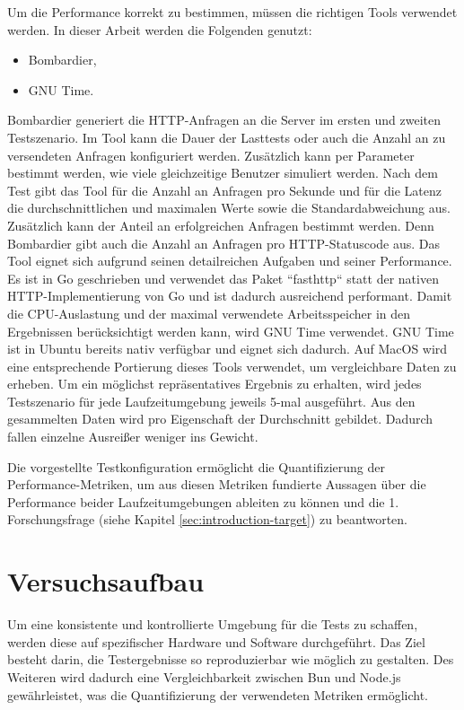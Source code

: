 \noindent
Um die Performance korrekt zu bestimmen, müssen die richtigen Tools verwendet werden. In dieser Arbeit werden die Folgenden genutzt:

\begin{itemize}
	\item Bombardier,
	\item GNU Time.
\end{itemize}

\noindent
Bombardier generiert die HTTP-Anfragen an die Server im ersten und zweiten Testszenario. Im Tool kann die Dauer der Lasttests oder auch die Anzahl an zu versendeten Anfragen konfiguriert werden. Zusätzlich kann per Parameter bestimmt werden, wie viele gleichzeitige Benutzer simuliert werden. Nach dem Test gibt das Tool für die Anzahl an Anfragen pro Sekunde und für die Latenz die durchschnittlichen und maximalen Werte sowie die Standardabweichung aus. Zusätzlich kann der Anteil an erfolgreichen Anfragen bestimmt werden. Denn Bombardier gibt auch die Anzahl an Anfragen pro HTTP-Statuscode aus. Das Tool eignet sich aufgrund seinen detailreichen Aufgaben und seiner Performance. Es ist in Go geschrieben und verwendet das Paket ``fasthttp`` statt der nativen HTTP-Implementierung von Go und ist dadurch ausreichend performant. Damit die CPU-Auslastung und der maximal verwendete Arbeitsspeicher in den Ergebnissen berücksichtigt werden kann, wird GNU Time verwendet. GNU Time ist in Ubuntu bereits nativ verfügbar und eignet sich dadurch. Auf MacOS wird eine entsprechende Portierung dieses Tools verwendet, um vergleichbare Daten zu erheben. \newline
Um ein möglichst repräsentatives Ergebnis zu erhalten, wird jedes Testszenario für jede Laufzeitumgebung jeweils 5-mal ausgeführt. Aus den gesammelten Daten wird pro Eigenschaft der Durchschnitt gebildet. Dadurch fallen einzelne Ausreißer weniger ins Gewicht.

\noindent
Die vorgestellte Testkonfiguration ermöglicht die Quantifizierung der Performance-Metriken, um aus diesen Metriken fundierte Aussagen über die Performance beider Laufzeitumgebungen ableiten zu können und die 1. Forschungsfrage (siehe Kapitel \ref{sec:introduction-target}) zu beantworten.


\section{Versuchsaufbau} \label{sec:performance-testSetup}
Um eine konsistente und kontrollierte Umgebung für die Tests zu schaffen, werden diese auf spezifischer Hardware und Software durchgeführt. Das Ziel besteht darin, die Testergebnisse so reproduzierbar wie möglich zu gestalten. Des Weiteren wird dadurch eine Vergleichbarkeit zwischen Bun und Node.js gewährleistet, was die Quantifizierung der verwendeten Metriken ermöglicht.

